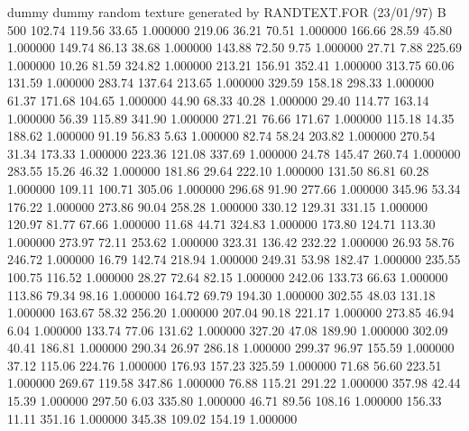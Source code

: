 dummy
dummy
random texture generated by RANDTEXT.FOR (23/01/97)
B   500   
    102.74    119.56     33.65  1.000000
    219.06     36.21     70.51  1.000000
    166.66     28.59     45.80  1.000000
    149.74     86.13     38.68  1.000000
    143.88     72.50      9.75  1.000000
     27.71      7.88    225.69  1.000000
     10.26     81.59    324.82  1.000000
    213.21    156.91    352.41  1.000000
    313.75     60.06    131.59  1.000000
    283.74    137.64    213.65  1.000000
    329.59    158.18    298.33  1.000000
     61.37    171.68    104.65  1.000000
     44.90     68.33     40.28  1.000000
     29.40    114.77    163.14  1.000000
     56.39    115.89    341.90  1.000000
    271.21     76.66    171.67  1.000000
    115.18     14.35    188.62  1.000000
     91.19     56.83      5.63  1.000000
     82.74     58.24    203.82  1.000000
    270.54     31.34    173.33  1.000000
    223.36    121.08    337.69  1.000000
     24.78    145.47    260.74  1.000000
    283.55     15.26     46.32  1.000000
    181.86     29.64    222.10  1.000000
    131.50     86.81     60.28  1.000000
    109.11    100.71    305.06  1.000000
    296.68     91.90    277.66  1.000000
    345.96     53.34    176.22  1.000000
    273.86     90.04    258.28  1.000000
    330.12    129.31    331.15  1.000000
    120.97     81.77     67.66  1.000000
     11.68     44.71    324.83  1.000000
    173.80    124.71    113.30  1.000000
    273.97     72.11    253.62  1.000000
    323.31    136.42    232.22  1.000000
     26.93     58.76    246.72  1.000000
     16.79    142.74    218.94  1.000000
    249.31     53.98    182.47  1.000000
    235.55    100.75    116.52  1.000000
     28.27     72.64     82.15  1.000000
    242.06    133.73     66.63  1.000000
    113.86     79.34     98.16  1.000000
    164.72     69.79    194.30  1.000000
    302.55     48.03    131.18  1.000000
    163.67     58.32    256.20  1.000000
    207.04     90.18    221.17  1.000000
    273.85     46.94      6.04  1.000000
    133.74     77.06    131.62  1.000000
    327.20     47.08    189.90  1.000000
    302.09     40.41    186.81  1.000000
    290.34     26.97    286.18  1.000000
    299.37     96.97    155.59  1.000000
     37.12    115.06    224.76  1.000000
    176.93    157.23    325.59  1.000000
     71.68     56.60    223.51  1.000000
    269.67    119.58    347.86  1.000000
     76.88    115.21    291.22  1.000000
    357.98     42.44     15.39  1.000000
    297.50      6.03    335.80  1.000000
     46.71     89.56    108.16  1.000000
    156.33     11.11    351.16  1.000000
    345.38    109.02    154.19  1.000000
